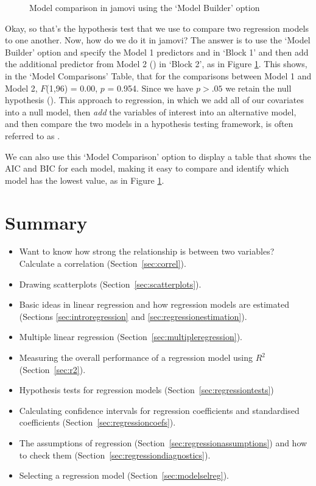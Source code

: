 \vspace{0.3cm}
\begin{figure}[!htb]
\begin{center}
\caption{Model comparison in jamovi using the `Model Builder' option}
\HR
\label{fig:reg8}
\end{center}
\end{figure}

Okay, so that's the hypothesis test that we use to compare two regression models to one another. Now, how do we do it in jamovi? The answer is to use the `Model Builder' option and specify the Model 1 predictors  and  in `Block 1' and then add the additional predictor from Model 2 () in `Block 2', as in Figure \ref{fig:reg8}. This shows, in the `Model Comparisons' Table, that for the comparisons between Model 1 and Model 2, $F$(1,96) = 0.00, $p$ = 0.954. Since we have $p>.05$ we retain the null hypothesis ().  This approach to regression, in which we add all of our covariates into a null model, then {\it add} the variables of interest into an alternative model, and then compare the two models in a hypothesis testing framework, is often referred to as .

We can also use this `Model Comparison' option to display a table that shows the AIC and BIC for each model, making it easy to compare and identify which model has the lowest value, as in Figure \ref{fig:reg8}.


\section{Summary}

\begin{itemize} \itemsep -2pt
\item Want to know how strong the relationship is between two variables? Calculate a correlation (Section~\ref{sec:correl}).
\item Drawing scatterplots (Section~\ref{sec:scatterplots}). 
\item Basic ideas in linear regression and how regression models are estimated (Sections \ref{sec:introregression} and \ref{sec:regressionestimation}).
\item Multiple linear regression (Section~\ref{sec:multipleregression}). 
\item Measuring the overall performance of a regression model using $R^2$ (Section~\ref{sec:r2}).
\item Hypothesis tests for regression models (Section~\ref{sec:regressiontests})
\item Calculating confidence intervals for regression coefficients and standardised coefficients (Section~\ref{sec:regressioncoefs}).
\item The assumptions of regression (Section~\ref{sec:regressionassumptions}) and how to check them (Section~\ref{sec:regressiondiagnostics}).
\item Selecting a regression model (Section~\ref{sec:modelselreg}).
\end{itemize}






